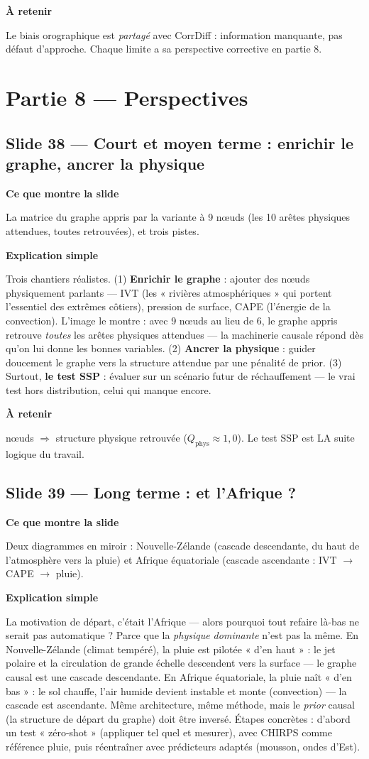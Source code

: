 \documentclass[11pt,a4paper]{article}
\newcommand{\slide}[2]{\subsection*{\textcolor{bleu}{Slide #1 --- #2}}}
\newcommand{\bloc}[1]{\par\medskip\noindent\textcolor{accent}{\textbf{#1}}\par\nopagebreak\smallskip}
\begin{document}
\bloc{À retenir}
Le biais orographique est \emph{partagé} avec CorrDiff : information manquante, pas défaut d'approche. Chaque limite a sa perspective corrective en partie 8.

\section{Partie 8 --- Perspectives}

\slide{38}{Court et moyen terme : enrichir le graphe, ancrer la physique}

\bloc{Ce que montre la slide}
La matrice du graphe appris par la variante à 9 n\oe uds (les 10 arêtes physiques attendues, toutes retrouvées), et trois pistes.

\bloc{Explication simple}
Trois chantiers réalistes. (1) \textbf{Enrichir le graphe} : ajouter des n\oe uds physiquement parlants --- IVT (les « rivières atmosphériques » qui portent l'essentiel des extrêmes côtiers), pression de surface, CAPE (l'énergie de la convection). L'image le montre : avec 9 n\oe uds au lieu de 6, le graphe appris retrouve \emph{toutes} les arêtes physiques attendues --- la machinerie causale répond dès qu'on lui donne les bonnes variables. (2) \textbf{Ancrer la physique} : guider doucement le graphe vers la structure attendue par une pénalité de prior. (3) Surtout, \textbf{le test SSP} : évaluer sur un scénario futur de réchauffement --- le vrai test hors distribution, celui qui manque encore.

\bloc{À retenir}
9 n\oe uds $\Rightarrow$ structure physique retrouvée ($Q_{\mathrm{phys}} \approx 1{,}0$). Le test SSP est LA suite logique du travail.

\slide{39}{Long terme : et l'Afrique ?}

\bloc{Ce que montre la slide}
Deux diagrammes en miroir : Nouvelle-Zélande (cascade descendante, du haut de l'atmosphère vers la pluie) et Afrique équatoriale (cascade ascendante : IVT $\to$ CAPE $\to$ pluie).

\bloc{Explication simple}
La motivation de départ, c'était l'Afrique --- alors pourquoi tout refaire là-bas ne serait pas automatique ? Parce que la \emph{physique dominante} n'est pas la même. En Nouvelle-Zélande (climat tempéré), la pluie est pilotée « d'en haut » : le jet polaire et la circulation de grande échelle descendent vers la surface --- le graphe causal est une cascade descendante. En Afrique équatoriale, la pluie naît « d'en bas » : le sol chauffe, l'air humide devient instable et monte (convection) --- la cascade est ascendante. Même architecture, même méthode, mais le \emph{prior} causal (la structure de départ du graphe) doit être inversé. Étapes concrètes : d'abord un test « zéro-shot » (appliquer tel quel et mesurer), avec CHIRPS comme référence pluie, puis réentraîner avec prédicteurs adaptés (mousson, ondes d'Est).
\end{document}
